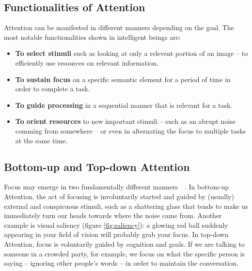 \documentclass[English]{style/ic-tese-v3}
\begin{document}
\subsection{Functionalities of Attention}
Attention can be manifested in different manners depending on the goal.
The most notable functionalities shown in intelligent beings are:
\begin{itemize}
    \item \textbf{To select stimuli} such as looking at only a relevent portion of an image --
        to efficiently use resources on relevant information.
    \item \textbf{To sustain focus} on a specific semantic element for a period of time in order to complete
        a task.
    \item \textbf{To guide processing} in a sequential manner that is relevant for a task.
    \item \textbf{To orient resources} to new important stimuli
        -- such as an abrupt noise comming from somewhere --
        or even in alternating the focus to multiple tasks at the same time.
\end{itemize}

\subsection{Bottom-up and Top-down Attention}
\label{bu-td}
Focus may emerge in two fundamentally different manners~\cite{ref:esther-thesis}~\cite{ref:vocus}.
In bottom-up Attention, the act of focusing is involuntarily
started and guided by (usually) external and conspicuous stimuli,
such as a shattering glass that tends to
make us immediately turn our heads towards where the noise came from.
Another example is visual saliency (figure \ref{fig:saliency}):
a glowing red ball suddenly appearing in
your field of vision will probably grab your focus.
In top-down Attention, focus is voluntarily guided by cognition and goals.
If we are talking to someone in a crowded party, for example,
we focus on what the specific person is saying
-- ignoring other people's words -- in order to maintain the conversation.
\end{document}
